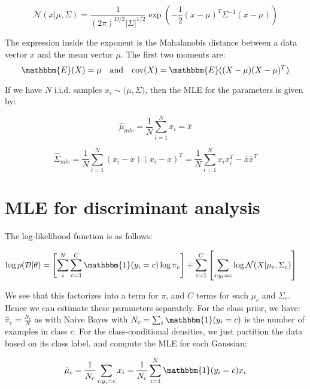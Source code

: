\documentclass[12pt, a4paper]{article}
\theoremstyle{definition}
\numberwithin{figure}{section}
\numberwithin{equation}{section}
\numberwithin{table}{section}
\begin{document}
\begin{equation}
\mathcal{N}(x | \mu, \Sigma) = \frac{1}{(2\pi)^{D/2} |\Sigma|^{1/2}} \exp \left( -\frac{1}{2} (x - \mu)^T \Sigma^{-1} (x - \mu) \right)
\end{equation}

The expression inside the exponent is the Mahalanobis distance between a data vector $x$ and the mean vector $\mu$. The first two moments are:
\begin{equation}
\mathbbm{E}(X)=\mu \quad \text{and} \quad
\text{cov}(X)=\mathbbm{E}((X-\mu)(X-\mu)^T)
\end{equation}

If we have $N$ i.i.d. samples $x_i \sim \mathcal(\mu, \Sigma)$, then the MLE for the parameters is given by:

\begin{equation}
\hat{\mu}_{mle} = \frac{1}{N}\sum_{i=1}^N x_i=\bar{x}
\end{equation}

\begin{equation}
\hat{\Sigma}_{mle} = \frac{1}{N}\sum_{i=1}^N (x_i-x)(x_i-x)^T = \frac{1}{N}\sum_{i=1}^N x_i x_i^T - \bar{x}\bar{x}^T
\end{equation}

\section{MLE for discriminant analysis}
The log-likelihood function is as follows:  

\begin{align}
\log p(\mathcal{D} | \theta)
&= \left[\sum_{i}^{N}\sum_{c=1}^{C} \mathbbm{1}(y_i = c) \log \pi_c\right] + \sum_{c=1}^{C}\left[\sum_{i:y_i = c} \log \mathcal{N}(X|\mu_c, \Sigma_c)\right]
\end{align}

We see that this factorizes into a term for $\pi$, and $C$ terms for each $\mu_c$ and $\Sigma_c$. Hence we can estimate these parameters separately. For the class prior, we have: $\hat{\pi}_c = \frac{N_c}{N}$ as with Naive Bayes with $N_c = \sum_{i} \mathbbm{1}(y_i = c)$ is the number of examples in class $c$. For the class-conditional densities, we just partition the data based on its class label, and compute the MLE for each Gaussian:

\begin{equation}
\hat{\mu}_c = \frac{1}{N_c} \sum_{i: y_i = c} x_i = \frac{1}{N_c} \sum_{i=1}^N \mathbbm{1}(y_i = c) x_i
\end{equation}
\end{document}
